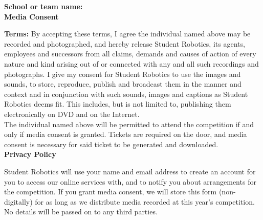 \documentclass[a4paper,10pt]{article}
\newcommand{\textfield}[1]{\textbf{#1:} \hrulefill\hspace{0mm}}
\newcommand{\fieldsep}{\\[2.5mm]}
\begin{document}
\textfield{School or team name} \fieldsep


\textbf{\large Media Consent}\\\vspace{-3mm}

\textbf{Terms:} By accepting these terms, I agree the individual named above may be recorded and photographed, and hereby release Student Robotics, its agents, employees and successors from all claims, demands and causes of action of every nature and kind arising out of or connected with any and all such recordings and photographs.
I give my consent for Student Robotics to use the images and sounds, to store, reproduce, publish and broadcast them in the manner and context and in conjunction with such sounds, images and captions as Student Robotics deems fit.
This includes, but is not limited to, publishing them electronically on DVD and on the Internet.\\

The individual named above will be permitted to attend the competition if and only if media consent is granted.
Tickets are required on the door, and media consent is necessary for said ticket to be generated and downloaded.\\


\textbf{\large Privacy Policy}\\\vspace{-3mm}

Student Robotics will use your name and email address to create an account for you to access our online services with, and to notify you about arrangements for the competition.
If you grant media consent, we will store this form (non-digitally) for as long as we distribute media recorded at this year's competition.
No details will be passed on to any third parties. \\
\end{document}
